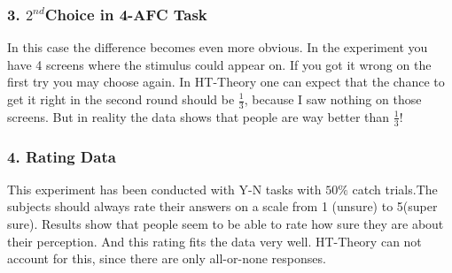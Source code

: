 \documentclass[../main/Notes.tex]{subfiles}
\begin{document}
\subsubsection*{3. $2^{nd}$Choice in 4-AFC Task}
In this case the difference becomes even more obvious. In the experiment you have 4 screens where the stimulus could appear on. If you got it wrong on the first try you may choose again. In HT-Theory one can expect that the chance to get it right in the second round should be $\frac{1}{3}$, because I saw nothing on those screens. But in reality the data shows that people are way better than $\frac{1}{3}$!  
\subsubsection*{4. Rating Data}
This experiment has been conducted with Y-N tasks with $50\%$ catch trials.The subjects should always rate their answers on a scale from 1 (unsure) to 5(super sure). Results show that people seem to be able to rate how sure they are about their perception. And this rating fits the data very well. HT-Theory can not account for this, since there are only all-or-none responses.
\end{document}
